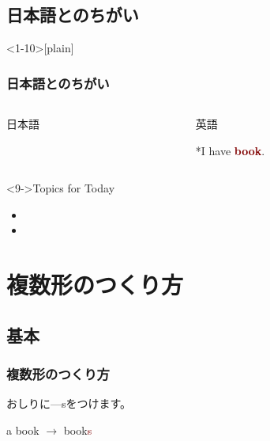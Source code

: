 \documentclass[aspectratio=169,xcolor={dvipsnames,table}]{beamer}
\begin{document}
\subsection{日本語とのちがい}
\begin{frame}<1-10>[plain]\frametitle{日本語とのちがい}
\begin{columns}
\begin{column}[t]{.45\textwidth}
\begin{alertblock}{日本語}


\end{alertblock}
\end{column}
\begin{column}[t]{.45\textwidth}
\begin{block}{英語}


*{I have \textcolor{Maroon}{\bfseries book}.}
\end{block}
\end{column}
\end{columns}

\begin{exampleblock}<9->{Topics for Today}
\begin{itemize}
 \item<1->  
 \item<2->  
\end{itemize}
      \end{exampleblock}

\end{frame}

\section{複数形のつくり方}
\subsection{基本}
\begin{frame}[plain]\frametitle{複数形のつくり方}
 
\Large
おしりに---sをつけます。

a book $\longrightarrow$ book\textcolor{Maroon}{s}

\end{frame}
\end{document}
